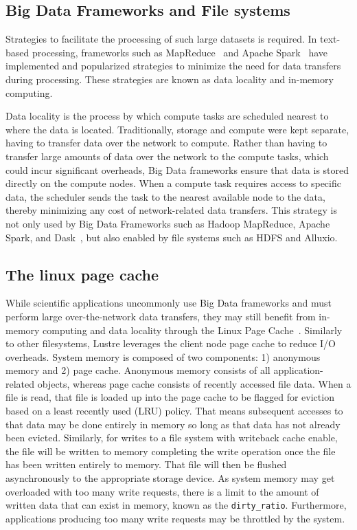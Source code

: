 \subsection{Big Data Frameworks and File systems}

      Strategies to facilitate the processing of such large datasets is
      required. In text-based processing, frameworks such as
      MapReduce~\cite{dean2008mapreduce} and Apache Spark~\cite{zaharia2016apache} have implemented
      and popularized strategies to minimize the need for data transfers during
      processing. These strategies are known as data locality and in-memory
      computing.

      Data locality is the process by which compute tasks are scheduled nearest
      to where the data is located. Traditionally, storage and compute were kept
      separate, having to transfer data over the network to compute. Rather than
      having to transfer large amounts of data over the network to the compute
      tasks, which could incur significant overheads, Big Data frameworks ensure
      that data is stored directly on the compute nodes. When a compute task
      requires access to specific data, the scheduler sends the task to the
      nearest available node to the data, thereby minimizing any cost of
      network-related data transfers. This strategy is not only used by Big Data
      Frameworks such as Hadoop MapReduce, Apache Spark, and Dask~\cite{rocklin2015dask},
      but also enabled by file systems such as HDFS and Alluxio.



\subsection{The linux page cache}
 While scientific applications uncommonly use Big Data frameworks and must
      perform large over-the-network data transfers, they may still benefit from
      in-memory computing and data locality through the Linux Page
      Cache~\cite{pagecache}. Similarly to other filesystems, Lustre leverages
      the client node page cache to reduce I/O overheads. System memory is
      composed of two components: 1) anonymous memory and 2) page cache.
      Anonymous memory consists of all application-related objects, whereas page
      cache consists of recently accessed file data. When a file is read, that
      file is loaded up into the page cache to be flagged for eviction based on
      a least recently used (LRU) policy. That means subsequent accesses to that
      data may be done entirely in memory so long as that data has not already
      been evicted. Similarly, for writes to a file system with writeback cache
      enable, the file will be written to memory completing the write operation
      once the file has been written entirely to memory. That file will then be
      flushed asynchronously to the appropriate storage device. As system memory
      may get overloaded with too many write requests, there is a limit to the
      amount of written data that can exist in memory, known as the
      \texttt{dirty\_ratio}. Furthermore, applications producing too many write
      requests may be throttled by the system.

